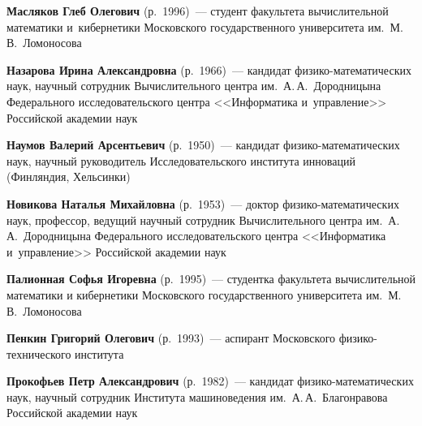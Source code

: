 \begin{multicols}{2}
\vspace*{6pt}

\noindent
\textbf{Масляков Глеб Олегович} (р.\ 1996)~--- студент факультета вычислительной математики 
и~кибернетики Московского государственного университета им.\ М.\,В.~Ломоносова

\vspace*{6pt}

\noindent
\textbf{Назарова Ирина Александровна} (р.\ 1966)~--- 
кандидат фи\-зи\-ко-ма\-те\-ма\-ти\-че\-ских наук, научный со\-труд\-ник 
Вычислительного центра им.\ А.\,А.~Дородницына Федерального исследовательского центра 
<<Информатика и~управ\-ле\-ние>> Российской академии наук

\vspace*{6pt}

\noindent
\textbf{Наумов Валерий Арсентьевич} (р.\ 1950)~--- 
кандидат фи\-зи\-ко-ма\-те\-ма\-ти\-че\-ских наук, 
научный руководитель Исследовательского института инноваций (Финляндия, Хельсинки)

\vspace*{6pt}

\noindent
\textbf{Новикова Наталья Михайловна} (р.\ 1953)~--- доктор 
фи\-зи\-ко-ма\-те\-ма\-ти\-че\-ских наук, профессор, ведущий научный со\-труд\-ник 
Вычислительного центра им.\ А.\,А.~Дородницына Федерального исследовательского центра 
<<Информатика и~управ\-ле\-ние>> Российской академии наук


\vspace*{6pt}


\noindent
\textbf{Палионная Софья Игоревна} (р.\ 1995)~--- студентка факультета вычислительной 
математики и кибернетики Московского государственного университета им.\ М.\,В.~Ломоносова



\columnbreak




\noindent
\textbf{Пенкин Григорий Олегович} (р.\ 1993)~--- 
аспирант Московского фи\-зи\-ко-тех\-ни\-че\-ско\-го института

\vspace*{6pt}

\def\leftkol{ОБ АВТОРАХ}
\def\rightkol{ОБ АВТОРАХ}

\noindent
\textbf{Прокофьев Петр Александрович} (р.\ 1982)~--- 
кандидат фи\-зи\-ко-ма\-те\-ма\-ти\-че\-ских наук, 
научный сотрудник Института машиноведения им.\ А.\,А.~Благонравова 
Российской академии наук

\vspace*{6pt}


\end{multicols}
